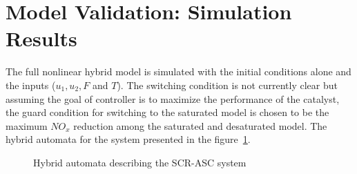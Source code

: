 \newpage
\section{Model Validation: Simulation Results}

The full nonlinear hybrid model is simulated with the initial conditions alone and the inputs ($u_1, u_2, F$ and $T$). The switching condition is not currently clear but assuming the goal of controller is to maximize the performance of the catalyst, the guard condition for switching to the saturated model is chosen to be the maximum $NO_x$ reduction among the saturated and desaturated model. The hybrid automata for the system presented in the figure~\ref{fig::hybrid_automata}.

\begin{figure}[H]
        \centering
        \caption{Hybrid automata describing the SCR-ASC system}
        \label{fig::hybrid_automata}
\end{figure}
